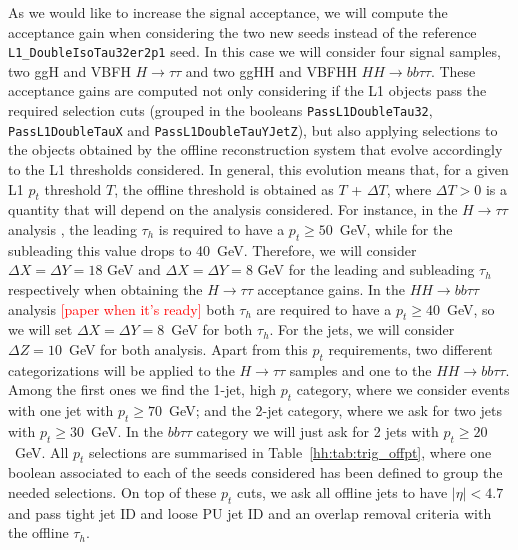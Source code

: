 \documentclass[../main.tex]{subfiles}
\begin{document}
As we would like to increase the signal acceptance, we will compute the acceptance gain when considering the two new seeds instead of the reference \texttt{L1\_DoubleIsoTau32er2p1} seed. In this case we will consider four signal samples, two ggH and VBFH $H\to\tau\tau$ and two ggHH and VBFHH $HH\to bb\tau\tau$. These acceptance gains are computed not only considering if the L1 objects pass the required selection cuts (grouped in the booleans \texttt{PassL1DoubleTau32}, \texttt{PassL1DoubleTauX} and \texttt{PassL1DoubleTauYJetZ}), but also applying selections to the objects obtained by the offline reconstruction system that evolve accordingly to the L1 thresholds considered. In general, this evolution means that, for a given L1 $p_t$ threshold $T$, the offline threshold is obtained as $T$ + $\Delta T$, where $\Delta T>0$ is a quantity that will depend on the analysis considered. For instance, in the $H\to\tau\tau$ analysis \cite{hh:htt_2016}, the leading $\tau_h$ is required to have a $p_t\geq 50$~GeV, while for the subleading this value drops to 40~GeV. Therefore, we will consider $\Delta X=\Delta Y=18$ GeV and $\Delta X=\Delta Y=8$ GeV for the leading and subleading $\tau_h$ respectively when obtaining the $H\to\tau\tau$ acceptance gains. In the $HH\to bb\tau\tau$ analysis \textcolor{red}{[paper when it's ready]} both $\tau_h$ are required to have a $p_t\geq40$~GeV, so we will set $\Delta X=\Delta Y=8$~GeV for both $\tau_h$. For the jets, we will consider $\Delta Z=10$~GeV for both analysis. Apart from this $p_t$ requirements, two different categorizations will be applied to the $H\to\tau\tau$ samples and one to the $HH\to bb\tau\tau$. Among the first ones we find the 1-jet, high $p_t$ category, where we consider events with one jet with $p_t\geq70$~GeV; and the 2-jet category, where we ask for two jets with $p_t\geq30$~GeV. In the $bb\tau\tau$ category we will just ask for 2 jets with $p_t\geq20$~GeV. All $p_t$ selections are summarised in Table~\ref{hh:tab:trig_offpt}, where one boolean associated to each of the seeds considered has been defined to group the needed selections. On top of these $p_t$ cuts, we ask all offline jets to have $|\eta|<4.7$ and pass tight jet ID and loose PU jet ID and an overlap removal criteria with the offline $\tau_h$.
\end{document}
